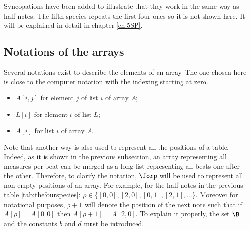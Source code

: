 \begin{table}[h]
    \centering
    \caption{Relative MIDI values of figure \ref{fig:thefourspecies}.}
    \label{tab:thefourspecies}
\end{table}

Syncopations have been added to illustrate that they work in the same way as half notes. The fifth species repeats the first four ones so it is not shown here. It will be explained in detail in chapter \ref{ch:5SP}.

\subsection{Notations of the arrays} Several notations exist to describe the elements of an array. The one chosen here is close to the computer notation with the indexing starting at zero.
\begin{multicols}{3}
    \begin{itemize}
        \item $A[i, j]$ for element $j$ of list $i$ of array $A$;
        \item $L[i]$ for element $i$ of list $L$;
        \item $A[i]$ for list $i$ of array $A$.
    \end{itemize}
\end{multicols}

Note that another way is also used to represent all the positions of a table. Indeed, as it is shown in the previous subsection, an array representing all measures per beat can be merged as a long list representing all beats one after the other. Therefore, to clarify the notation, $\forp$ will be used to represent all non-empty positions of an array. For example, for the half notes in the previous table \ref{tab:thefourspecies}: $\rho \in \{[0, 0], [2, 0], [0, 1], [2, 1], \dots\}$. Moreover for notational purposes, $\rho + 1$ will denote the position of the next note such that if $A[\rho] = A[0, 0]$ then $A[\rho + 1] = A[2, 0]$. To explain it properly, the set $\B$ and the constants $b$ and $d$ must be introduced.

